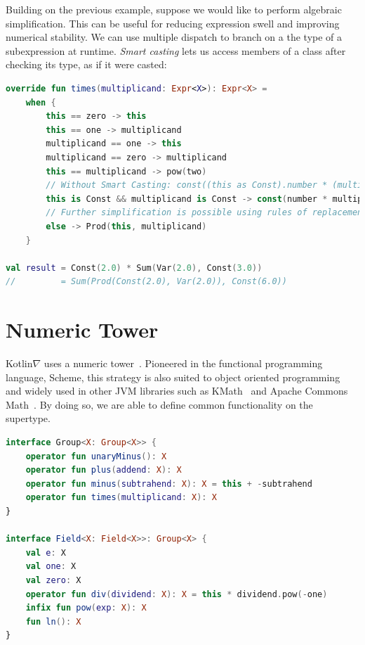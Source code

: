 \documentclass[12pt,initial,twoside,maitrise]{dms}
\numberwithin{equation}{section}
\numberwithin{table}{chapter}
\numberwithin{figure}{chapter}
\begin{document}
Building on the previous example, suppose we would like to perform algebraic simplification. This can be useful for reducing expression swell and improving numerical stability. We can use multiple dispatch to branch on a the type of a subexpression at runtime. \textit{Smart casting} lets us access  members of a class after checking its type, as if it were casted:

\begin{lstlisting}[caption={Multiple dispatch allows us to put all related control flow on a single abstract class which is inherited by subclasses, simplifying readability, debugging and refactoring.}, language=Kotlin]
override fun times(multiplicand: Expr<X>): Expr<X> =
    when {
        this == zero -> this
        this == one -> multiplicand
        multiplicand == one -> this
        multiplicand == zero -> multiplicand
        this == multiplicand -> pow(two)
        // Without Smart Casting: const((this as Const).number * (multiplicand as Const).number)
        this is Const && multiplicand is Const -> const(number * multiplicand.number) // With SC
        // Further simplification is possible using rules of replacement
        else -> Prod(this, multiplicand)
    }

val result = Const(2.0) * Sum(Var(2.0), Const(3.0))
//         = Sum(Prod(Const(2.0), Var(2.0)), Const(6.0))
\end{lstlisting}

\section{Numeric Tower}\label{sec:numeric-tower}

Kotlin$\nabla$ uses a numeric tower~\cite{st2012typing}. Pioneered in the functional programming language, Scheme\cite{sperber2009revised}, this strategy is also suited to object oriented programming~\cite{niculescu2003design, niculescu2011using} and widely used in other JVM libraries such as KMath~\cite{nozik2019acat} and Apache Commons Math~\cite{developers2012apache}. By doing so, we are able to define common functionality on the supertype.

\begin{lstlisting}[caption={Most mathematica loperations are composed of simple operators.}, language=Kotlin]
interface Group<X: Group<X>> {
    operator fun unaryMinus(): X
    operator fun plus(addend: X): X
    operator fun minus(subtrahend: X): X = this + -subtrahend
    operator fun times(multiplicand: X): X
}

interface Field<X: Field<X>>: Group<X> {
    val e: X
    val one: X
    val zero: X
    operator fun div(dividend: X): X = this * dividend.pow(-one)
    infix fun pow(exp: X): X
    fun ln(): X
}
\end{lstlisting}
\end{document}
